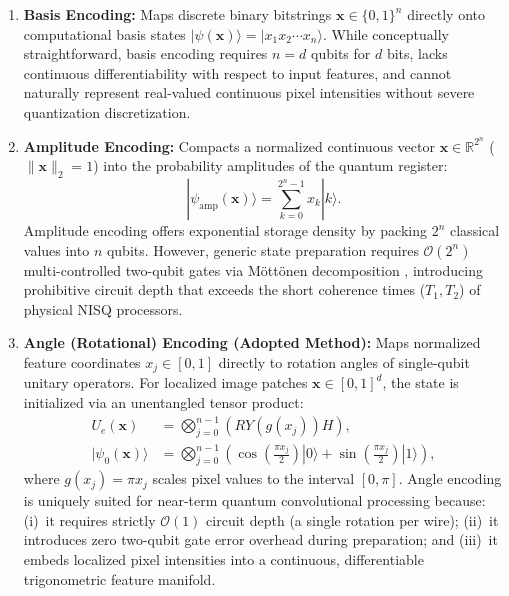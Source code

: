 \documentclass[journal]{IEEEtran}
\begin{document}
\begin{enumerate}
    \item \textbf{Basis Encoding:} Maps discrete binary bitstrings $\mathbf{x} \in \{0, 1\}^n$ directly onto computational basis states $|\psi(\mathbf{x})\rangle = |x_1 x_2 \cdots x_n\rangle$. While conceptually straightforward, basis encoding requires $n = d$ qubits for $d$ bits, lacks continuous differentiability with respect to input features, and cannot naturally represent real-valued continuous pixel intensities without severe quantization discretization.
    \item \textbf{Amplitude Encoding:} Compacts a normalized continuous vector $\mathbf{x} \in \mathbb{R}^{2^n}$ ($\|\mathbf{x}\|_2 = 1$) into the probability amplitudes of the quantum register:
    \begin{equation}
    |\psi_{\mathrm{amp}}(\mathbf{x})\rangle = \sum_{k=0}^{2^n - 1} x_k |k\rangle.
    \label{eq:amplitude_encoding}
    \end{equation}
    Amplitude encoding offers exponential storage density by packing $2^n$ classical values into $n$ qubits. However, generic state preparation requires $\mathcal{O}(2^n)$ multi-controlled two-qubit gates via Möttönen decomposition \cite{mottonen2004transformation}, introducing prohibitive circuit depth that exceeds the short coherence times ($T_1, T_2$) of physical NISQ processors.
    \item \textbf{Angle (Rotational) Encoding (Adopted Method):} Maps normalized feature coordinates $x_j \in [0, 1]$ directly to rotation angles of single-qubit unitary operators. For localized image patches $\mathbf{x} \in [0, 1]^d$, the state is initialized via an unentangled tensor product:
    \begin{align}
    U_e(\mathbf{x}) &= \bigotimes_{j=0}^{n-1} \left( RY(g(x_j)) H \right), \nonumber \\
    |\psi_0(\mathbf{x})\rangle &= \bigotimes_{j=0}^{n-1} \left( \cos\left(\frac{\pi x_j}{2}\right) |0\rangle + \sin\left(\frac{\pi x_j}{2}\right) |1\rangle \right),
    \label{eq:angle_encoding_exact}
    \end{align}
    where $g(x_j) = \pi x_j$ scales pixel values to the interval $[0, \pi]$. Angle encoding is uniquely suited for near-term quantum convolutional processing because: (i)~it requires strictly $\mathcal{O}(1)$ circuit depth (a single rotation per wire); (ii)~it introduces zero two-qubit gate error overhead during preparation; and (iii)~it embeds localized pixel intensities into a continuous, differentiable trigonometric feature manifold.
\end{enumerate}
\end{document}
